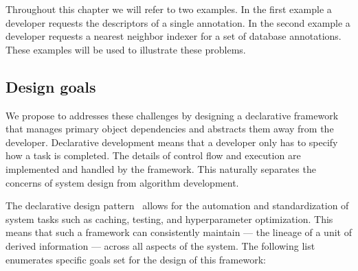     Throughout this chapter we will refer to two examples.
    In the first example a developer requests the descriptors of a single
      annotation.
    In the second example a developer requests a nearest neighbor indexer for
      a set of database annotations.
    These examples will be used to illustrate these problems.

    \subsection{Design goals}
    We propose to addresses these challenges by designing a declarative
      framework that manages primary object dependencies and abstracts them away
      from the developer.
    Declarative development means that a developer only has to specify how a
      task is completed.
    The details of control flow and execution are implemented and handled by
      the framework.
    This naturally separates the concerns of system design from algorithm
      development.

    The declarative design pattern~\cite{vlissides_design_1995} allows for the
      automation and standardization of system tasks such as caching, testing,
      and hyperparameter optimization.
    This means that such a framework can consistently maintain
       --- the lineage of a unit of derived information
      --- across all aspects of the system.
    The following list enumerates specific goals set for the design of this
      framework:

